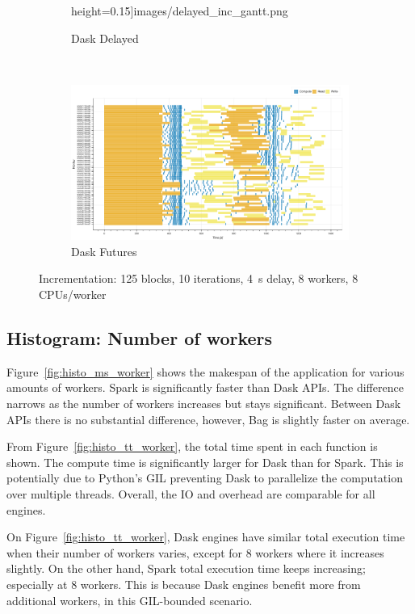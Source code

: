 \documentclass[conference]{IEEEtran}
\begin{document}
\begin{figure}[!b]
\begin{subfigure}[b]{\columnwidth}
        height=0.15\textheight]{images/delayed_inc_gantt.png}%
        \caption{Dask Delayed}\label{fig:inc_dask_delayed_gantt}
    \end{subfigure}
    \\
    \begin{subfigure}[b]{\columnwidth}
        \includegraphics[clip,width=\columnwidth,
        height=0.15\textheight]{images/futures_inc_gantt.png}%
        \caption{Dask Futures}\label{fig:inc_dask_futures_gantt}
    \end{subfigure}
    \caption{Incrementation: 125 blocks, 10 iterations, \SI{4}{\second} delay, 8 workers,
8 CPUs/worker}\label{fig:inc_gantt}
\end{figure}

\subsection{Histogram: Number of workers}
Figure~\ref{fig:histo_ms_worker} shows the makespan of the application for various
amounts of workers. Spark is significantly faster than Dask APIs. The difference
narrows as the number of workers increases but stays significant. Between Dask APIs
there is no substantial difference, however, Bag is slightly faster on average.

From Figure~\ref{fig:histo_tt_worker}, the total time spent in each function is
shown. The compute time is significantly larger for Dask than for Spark. This is
potentially due to Python's GIL preventing Dask to parallelize the computation
over
multiple threads. Overall, the IO and overhead are comparable for all engines.

On Figure~\ref{fig:histo_tt_worker}, Dask engines have similar total execution time
when their number of workers varies, except for 8 workers where it increases slightly.
On the other hand, Spark total execution time keeps increasing; especially at 8
workers. This is because Dask engines benefit more from additional workers, in
this GIL-bounded scenario.
\end{document}
